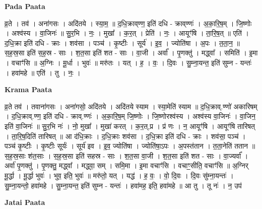 \documentclass[17pt]{extarticle}
\begin{document}
\textbf{Pada Paata} \newline

व्र॒ते । तव॑ । अना॑गसः । अदि॑तये । स्या॒म॒ ॥ द॒धि॒क्राव्‌ण्ण॒ इति॑ दधि - क्राव्‌ण्णः॑ । अ॒का॒रि॒ष॒म् । जि॒ष्णोः । अश्व॑स्य । वा॒जिनः॑ ॥ सु॒र॒भि । नः॒ । मुखा᳚ । क॒र॒त् । प्रेति॑ । नः॒ । आयूꣳ॑षि । ता॒रि॒ष॒त् ॥ एति॑ । द॒धि॒क्रा इति॑ दधि - क्राः । शव॑सा । पञ्च॑ । कृ॒ष्टीः । सूर्य॑ । इ॒व॒ । ज्योति॑षा । अ॒पः । त॒ता॒न॒ ॥ स॒ह॒स्र॒सा इति॑ स॒ह॒स्र - साः । श॒त॒सा इति॑ शत - साः । वा॒जी । अर्वा᳚ । पृ॒णक्तु॑ । मद्ध्वा᳚ । समिति॑ । इ॒मा । वचाꣳ॑सि ॥ अ॒ग्निः । मू॒र्धा । भुवः॑ ॥ मरु॑तः । यत् । ह॒ । वः॒ । दि॒वः । सु॒म्ना॒यन्त॒ इति॑ सुम्न - यन्तः॑ । हवा॑महे ॥ एति॑ । तु । नः॒ ।  \newline


\textbf{Krama Paata} \newline

व्र॒ते तव॑ । तवाना॑गसः । अना॑गसो॒ अदि॑तये । अदि॑तये स्याम । स्या॒मेति॑ स्याम ॥ द॒धि॒क्राव्.ण्णो॑ अकारिषम् । द॒धि॒क्राव्.ण्ण॒ इति॑ दधि - क्राव्.ण्णः॑ । अ॒का॒रि॒ष॒म् जि॒ष्णोः । जि॒ष्णोरश्व॑स्य । अश्व॑स्य वा॒जिनः॑ । वा॒जिन॒ इति॑ वा॒जिनः॑ ॥ सु॒र॒भि नः॑ । नो॒ मुखा᳚ । मुखा॑ करत् । क॒र॒त्,प्र । प्र॑ णः । न॒ आयूꣳ॑षि । आयूꣳ॑षि तारिषत् । ता॒रि॒ष॒दिति॑ तारिषत् ॥ आ द॑धि॒क्राः । द॒धि॒क्राः शव॑सा । द॒धि॒क्रा इति॑ दधि - क्राः । शव॑सा॒ पञ्च॑ । पञ्च॑ कृ॒ष्टीः । कृ॒ष्टीः सूर्यः॑ । सूर्य॑ इव । इ॒व॒ ज्योति॑षा । ज्योति॑षा॒ऽपः । अ॒पस्त॑तान । त॒ता॒नेति॑ ततान ॥ स॒ह॒स्र॒साः श॑त॒साः । स॒ह॒स्र॒सा इति॑ सहस्र - साः । श॒त॒सा वा॒जी । श॒त॒सा इति॑ शत - साः । वा॒ज्यर्वा᳚ । अर्वा॑ पृ॒णक्तु॑ । पृ॒णक्तु॒ मद्ध्वा᳚ । मद्ध्वा॒ सम् । समि॒मा । इ॒मा वचाꣳ॑सि । वचाꣳ॒॒सीति॒ वचाꣳ॑सि ॥ अ॒ग्निर् मू॒र्द्धा । मू॒र्द्धा भुवः॑ । भुव॒ इति॒ भुवः॑ ॥ मरु॑तो॒ यत् । यद्ध॑ । ह॒ वः॒ । वो॒ दि॒वः । दि॒वः सु॑म्ना॒यन्तः॑ । सु॒म्ना॒यन्तो॒ हवा॑महे । सु॒म्ना॒यन्त॒ इति॑ सुम्न - यन्तः॑ । हवा॑मह॒ इति॒ हवा॑महे ॥ आ तु । तू नः॑ । न॒ उप॑ \newline

\textbf{Jatai Paata} \newline
\end{document}
